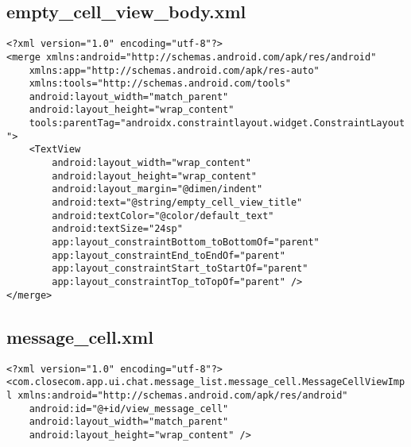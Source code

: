 \documentclass[listing]{espd}
\begin{document}
\subsection{empty\_cell\_view\_body.xml}
\begin{verbatim}
<?xml version="1.0" encoding="utf-8"?>
<merge xmlns:android="http://schemas.android.com/apk/res/android"
    xmlns:app="http://schemas.android.com/apk/res-auto"
    xmlns:tools="http://schemas.android.com/tools"
    android:layout_width="match_parent"
    android:layout_height="wrap_content"
    tools:parentTag="androidx.constraintlayout.widget.ConstraintLayout
">
    <TextView
        android:layout_width="wrap_content"
        android:layout_height="wrap_content"
        android:layout_margin="@dimen/indent"
        android:text="@string/empty_cell_view_title"
        android:textColor="@color/default_text"
        android:textSize="24sp"
        app:layout_constraintBottom_toBottomOf="parent"
        app:layout_constraintEnd_toEndOf="parent"
        app:layout_constraintStart_toStartOf="parent"
        app:layout_constraintTop_toTopOf="parent" />
</merge>
\end{verbatim}

\subsection{message\_cell.xml}
\begin{verbatim}
<?xml version="1.0" encoding="utf-8"?>
<com.closecom.app.ui.chat.message_list.message_cell.MessageCellViewImp
l xmlns:android="http://schemas.android.com/apk/res/android"
    android:id="@+id/view_message_cell"
    android:layout_width="match_parent"
    android:layout_height="wrap_content" />
\end{verbatim}
\end{document}
